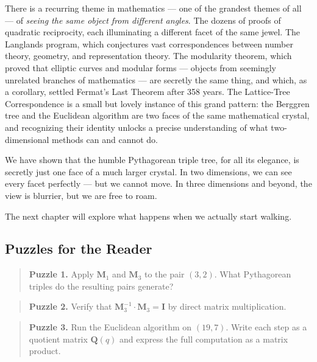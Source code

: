 There is a recurring theme in mathematics --- one of the grandest themes of all --- of \textit{seeing the same object from different angles}. The dozens of proofs of quadratic reciprocity, each illuminating a different facet of the same jewel. The Langlands program, which conjectures vast correspondences between number theory, geometry, and representation theory. The modularity theorem, which proved that elliptic curves and modular forms --- objects from seemingly unrelated branches of mathematics --- are secretly the same thing, and which, as a corollary, settled Fermat's Last Theorem after 358 years. The Lattice-Tree Correspondence is a small but lovely instance of this grand pattern: the Berggren tree and the Euclidean algorithm are two faces of the same mathematical crystal, and recognizing their identity unlocks a precise understanding of what two-dimensional methods can and cannot do.

We have shown that the humble Pythagorean triple tree, for all its elegance, is secretly just one face of a much larger crystal. In two dimensions, we can see every facet perfectly --- but we cannot move. In three dimensions and beyond, the view is blurrier, but we are free to roam.

The next chapter will explore what happens when we actually start walking.


\ornbreak



\subsection{Puzzles for the Reader}


\begin{quote}
\textbf{Puzzle 1.} Apply $\mathbf{M}_1$ and $\mathbf{M}_3$ to the pair $(3, 2)$. What Pythagorean triples do the resulting pairs generate?
\end{quote}

\begin{quote}
\textbf{Puzzle 2.} Verify that $\mathbf{M}_3^{-1} \cdot \mathbf{M}_3 = \mathbf{I}$ by direct matrix multiplication.
\end{quote}

\begin{quote}
\textbf{Puzzle 3.} Run the Euclidean algorithm on $(19, 7)$. Write each step as a quotient matrix $\mathbf{Q}(q)$ and express the full computation as a matrix product.
\end{quote}


